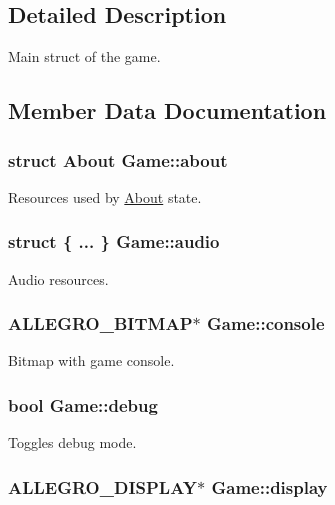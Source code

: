 \subsection{Detailed Description}
Main struct of the game. 

\subsection{Member Data Documentation}
\hypertarget{structGame_a0f7f35de759c984c4b53c86fb0dcbd44}{
\subsubsection[{about}]{\setlength{\rightskip}{0pt plus 5cm}struct {\bf About} Game\-::about}}\label{structGame_a0f7f35de759c984c4b53c86fb0dcbd44}
Resources used by \hyperlink{structAbout}{About} state. \hypertarget{structGame_a5e48e630a0570f9028a459f571db62d1}{
\subsubsection[{audio}]{\setlength{\rightskip}{0pt plus 5cm}struct \{ ... \}   Game\-::audio}}\label{structGame_a5e48e630a0570f9028a459f571db62d1}
Audio resources. \hypertarget{structGame_aa2e3d0922374dc870a1aeabf9e3b8ae2}{
\subsubsection[{console}]{\setlength{\rightskip}{0pt plus 5cm}A\-L\-L\-E\-G\-R\-O\-\_\-\-B\-I\-T\-M\-A\-P$\ast$ Game\-::console}}\label{structGame_aa2e3d0922374dc870a1aeabf9e3b8ae2}
Bitmap with game console. \hypertarget{structGame_ad1a3eb5c2d99f8cb9c1f7eb91689af6d}{
\subsubsection[{debug}]{\setlength{\rightskip}{0pt plus 5cm}bool Game\-::debug}}\label{structGame_ad1a3eb5c2d99f8cb9c1f7eb91689af6d}
Toggles debug mode. \hypertarget{structGame_a2bf8ece79fe05b03c31f2e2ede42e5f5}{
\subsubsection[{display}]{\setlength{\rightskip}{0pt plus 5cm}A\-L\-L\-E\-G\-R\-O\-\_\-\-D\-I\-S\-P\-L\-A\-Y$\ast$ Game\-::display}}\label{structGame_a2bf8ece79fe05b03c31f2e2ede42e5f5}
